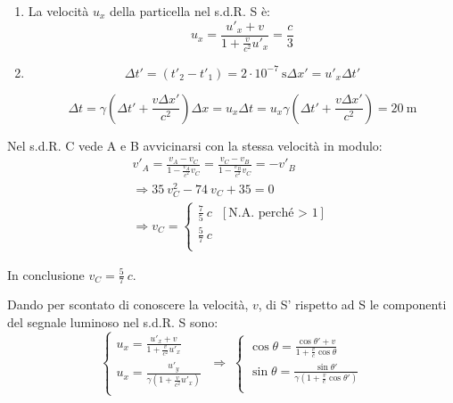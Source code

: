 \documentclass[12pt,twoside,a4]{article}
\begin{document}
\newpage
\begin{solution}
\vspace{-25pt}
\begin{enumerate}[label=(\textit{\roman*})]
 \item La velocità $u_x$ della particella nel s.d.R. S è:
 \begin{equation*}
     u_x = \frac{u'_x + v}{1 + \frac{v}{c^2}u'_x} = \frac{c}{3} 
 \end{equation*}
 
 \item \begin{equation*}
     \Delta t'= (t'_2 -t'_1) = 2 \cdot 10^{-7} \ \mathrm{s}     \Delta x'= u'_x \Delta t'  
 \end{equation*}
 
 \begin{equation*}
     \Delta t = \gamma \left(\Delta t'+\frac{v \Delta x'}{c^2} \right)    \Delta x = u_x \Delta t = u_x \gamma \left(\Delta t'+\frac{v \Delta x'}{c^2}\right) = 20 \ \mathrm{m} 
 \end{equation*}
 \end{enumerate}
\end{solution}
\begin{solution}
	Nel s.d.R. C vede A e B avvicinarsi con la stessa velocità in modulo: 
\begin{gather} 
    v'_A = \frac{v_A - v_C}{1-\frac{v_A}{c^2} v_C} = \frac{v_C - v_B}{1-\frac{v_B}{c^2} v_C} = - v'_B \\
    \Rightarrow  35 \ v^2_C - 74 \ v_C +35 = 0  \\  \Rightarrow   v_C = \begin{cases} 
    \frac{7}{5} \ c  \ \ \ [\text{N.A. perché > 1}]\\
    \frac{5}{7} \ c \\
    \end{cases} 
\end{gather}
 
 In conclusione $v_C = \frac{5}{7} \ c$.
\end{solution}

\begin{solution}
	Dando per scontato di conoscere la velocità, $v$, di S' rispetto ad S le componenti del segnale luminoso nel s.d.R. S sono: 
 \begin{equation*}
     \begin{cases} 
     u_x = \frac{u'_x + v}{1+\frac{v}{c^2} u'_x}\\
     u_x = \frac{u'_y}{\gamma \left(1+\frac{v}{c^2} u'_x \right)}\\ 
     \end{cases}
       \;  \Rightarrow  \; 
     \begin{cases} 
     \cos{\theta} = \frac{\cos{\theta'} + v}{1+\frac{v}{c} \cos{\theta}}\\
     \sin{\theta} = \frac{\sin{\theta'}}{\gamma \left(1+\frac{v}{c} \cos{\theta'} \right)}\\ 
     \end{cases} 
 \end{equation*}
\end{solution}
\end{document}
